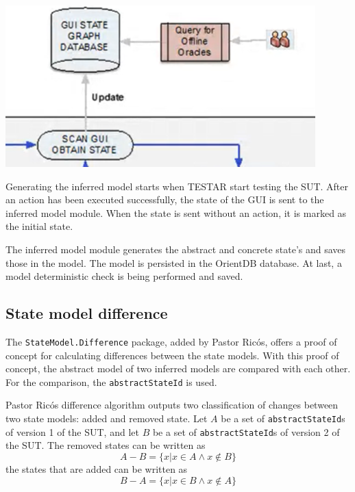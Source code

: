 \bigskip
\begingroup
\captionsetup{type=figure}
\includegraphics[scale=1]{pics/obtain-state-graph.png}
\label{fig:obtain-state-graph}
\endgroup

Generating the inferred model starts when TESTAR start testing the SUT. After an action has been executed successfully, the state of the GUI is sent to the inferred model module. When the state is sent without an action, it is marked as the initial state. 

The inferred model module generates the abstract and concrete state's and saves those in the model. The model is persisted in the OrientDB database. At last, a model deterministic check is being performed and saved.

\subsection{State model difference}
The \verb|StateModel.Difference| package, added by Pastor Ricós\cite{stateDiff}, offers a proof of concept for calculating differences between the state models. With this proof of concept, the abstract model of two inferred models are compared with each other. For the comparison, the \verb|abstractStateId| is used. 

Pastor Ricós difference algorithm\cite{stateDiff} outputs two classification of changes between two state models: added and removed state. Let $A$ be a set of \verb|abstractStateId|s of version 1 of the SUT, and let $B$ be a set of \verb|abstractStateId|s of version 2 of the SUT. The removed states can be written as
\[A-B = \lbrace x | x \in A \wedge x \notin B \rbrace\]
the states that are added can be written as
\[B-A = \lbrace x | x \in B \wedge x \notin A \rbrace\]

